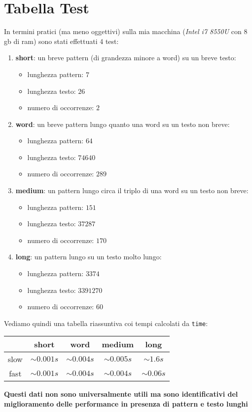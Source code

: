 \documentclass[a4paper,12pt, oneside]{article}
\begin{document}
\section*{Tabella Test}
In termini pratici (ma meno oggettivi) sulla mia macchina
(\textit{Intel i7 8550U} con $8$gb di ram) sono stati effettuati 4
test:
\begin{enumerate}
  \item \textbf{short}: un breve pattern (di grandezza minore a word)
  su un breve testo:
  \begin{itemize}
    \item lunghezza pattern: $7$
    \item lunghezza testo: $26$
    \item numero di occorrenze: $2$
  \end{itemize}
  \item \textbf{word}: un breve pattern lungo quanto una word su un
  testo non breve:
  \begin{itemize}
    \item lunghezza pattern: $64$
    \item lunghezza testo: $74640$
    \item numero di occorrenze: $289$
  \end{itemize}
  \item \textbf{medium}: un pattern lungo circa il triplo di una word
  su un testo non breve:
  \begin{itemize}
    \item lunghezza pattern: $151$
    \item lunghezza testo: $37287$
    \item numero di occorrenze: $170$
  \end{itemize}
  \item \textbf{long}: un pattern lungo su un testo molto lungo:
  \begin{itemize}
    \item lunghezza pattern: $3374$
    \item lunghezza testo: $3391270$
    \item numero di occorrenze: $60$
  \end{itemize}
\end{enumerate}
Vediamo quindi una tabella riassuntiva coi tempi calcolati da \texttt{time}:
\begin{center}
  \begin{tabular}{|c|c|c|c|c|}
    \hline
    & short        & word         & medium       & long        \\ \hline\hline
    slow & $\sim 0.001s$ & $\sim 0.004s$ & $\sim 0.005s$ & $\sim 1.6s$  \\ \hline
    fast & $\sim 0.001s$ & $\sim 0.004s$ & $\sim 0.004s$ & $\sim 0.06s$ \\ \hline
  \end{tabular}
\end{center}
\textbf{Questi dati non sono universalmente utili ma sono
  identificativi del miglioramento delle performance in presenza di
  pattern e testo lunghi}
\end{document}
